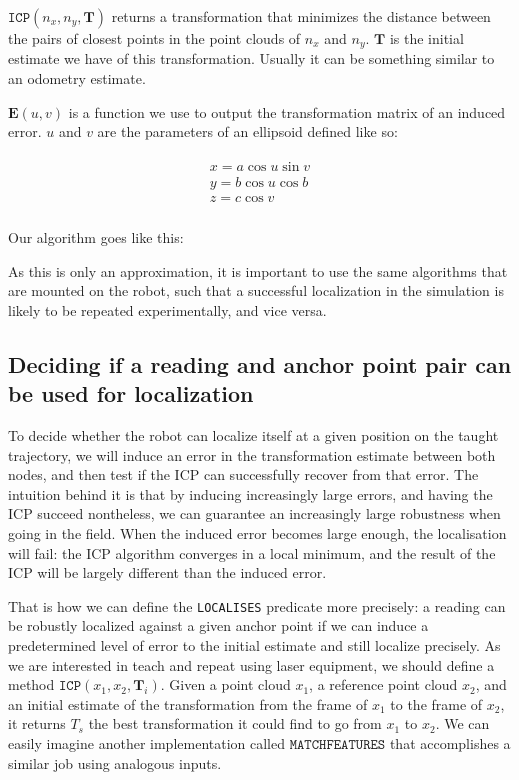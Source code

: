 \documentclass[letterpaper,10 pt,conference]{ieeeconf}
\newcommand{\mat}[1]{\mathbf{#1}}
\begin{document}
$\texttt{ICP}(n_x, n_y, \mat{T})$ returns a transformation that minimizes the
distance between the pairs of closest points in the point clouds of $n_x$ and
$n_y$. $\mat{T}$ is the initial estimate we have of this transformation. Usually
it can be something similar to an odometry estimate.

$\mat{E}(u,v)$ is a function we use to output the transformation matrix of an
induced error. $u$ and $v$ are the parameters of an ellipsoid defined like so:

\begin{align}
  \begin{split}
x = a \cos u \sin v \\
y = b \cos u \cos b \\
z = c \cos v \\
\end{split}
\end{align}

Our algorithm goes like this: 

As this is only an approximation, it is important to use the same algorithms
that are mounted on the robot, such that a successful localization in the
simulation is likely to be repeated experimentally, and vice versa.



 

\subsection{Deciding if a reading and anchor point pair can be used for localization}
\label{approach-deciding-converge}


To decide whether the robot can localize itself at a given position on the
taught trajectory, we will induce an error in the transformation estimate
between both nodes, and then test if the ICP can successfully recover from that
error. 
The intuition behind it is that by inducing increasingly
large errors, and having the ICP succeed nontheless, we can guarantee an
increasingly large robustness when going in the field. When the induced error
becomes large enough, the localisation will fail: the ICP algorithm converges in
a local minimum, and the result of the ICP will be largely different than the
induced error.

That is how we can define the \texttt{LOCALISES} predicate more precisely: a
reading can be robustly localized against a given anchor point if we can induce
a predetermined level of error to the initial estimate and still localize
precisely.
As we are interested in teach and repeat using laser equipment, we should define
a method $\texttt{ICP}(x_1, x_2, \mat{T}_i)$. 
Given a point cloud $x_1$, a
reference point cloud $x_2$, and an initial estimate of the transformation from
the frame of $x_1$ to the frame of $x_2$, it returns $T_s$ the best transformation
it could find to go from $x_1$ to $x_2$. 
We can easily imagine another implementation called $\texttt{MATCHFEATURES}$
that accomplishes a similar job using analogous inputs.
\end{document}
